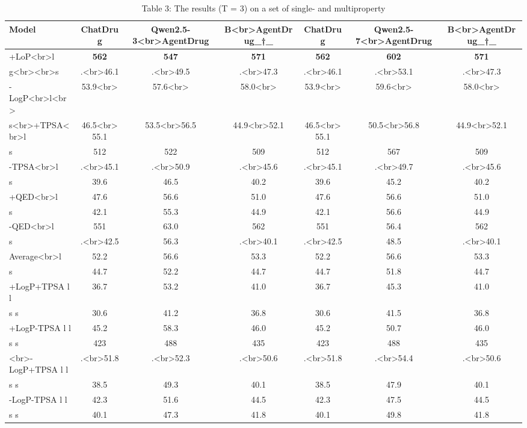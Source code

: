 \begin{table}[t]
\centering
\caption{Table 3: The results (T = 3) on a set of single- and multiproperty}
\label{tab:2410.13147}
\begin{tabular}{lcccccc}
\toprule
Model & ChatDrug & Qwen2.5-3<br>AgentDrug & B<br>AgentDrug\_†\_ & ChatDrug & Qwen2.5-7<br>AgentDrug & B<br>AgentDrug\_†\_ \\
\midrule
+LoP<br>l & \textbf{562} & \textbf{547} & \textbf{571} & \textbf{562} & \textbf{602} & \textbf{571} \\
g<br><br>s & .<br>46.1 & .<br>49.5 & .<br>47.3 & .<br>46.1 & .<br>53.1 & .<br>47.3 \\
-LogP<br>l<br> & 53.9<br> & 57.6<br> & 58.0<br> & 53.9<br> & 59.6<br> & 58.0<br> \\
s<br>+TPSA<br>l & 46.5<br>55.1 & 53.5<br>56.5 & 44.9<br>52.1 & 46.5<br>55.1 & 50.5<br>56.8 & 44.9<br>52.1 \\
s & 512 & 522 & 509 & 512 & 567 & 509 \\
-TPSA<br>l & .<br>45.1 & .<br>50.9 & .<br>45.6 & .<br>45.1 & .<br>49.7 & .<br>45.6 \\
s & 39.6 & 46.5 & 40.2 & 39.6 & 45.2 & 40.2 \\
+QED<br>l & 47.6 & 56.6 & 51.0 & 47.6 & 56.6 & 51.0 \\
s & 42.1 & 55.3 & 44.9 & 42.1 & 56.6 & 44.9 \\
-QED<br>l & 551 & 63.0 & 562 & 551 & 56.4 & 562 \\
s & .<br>42.5 & 56.3 & .<br>40.1 & .<br>42.5 & 48.5 & .<br>40.1 \\
Average<br>l & 52.2 & 56.6 & 53.3 & 52.2 & 56.6 & 53.3 \\
s & 44.7 & 52.2 & 44.7 & 44.7 & 51.8 & 44.7 \\
+LogP+TPSA l l & 36.7 & 53.2 & 41.0 & 36.7 & 45.3 & 41.0 \\
s s & 30.6 & 41.2 & 36.8 & 30.6 & 41.5 & 36.8 \\
+LogP-TPSA l l & 45.2 & 58.3 & 46.0 & 45.2 & 50.7 & 46.0 \\
s s & 423 & 488 & 435 & 423 & 488 & 435 \\
<br>-LogP+TPSA l l & .<br>51.8 & .<br>52.3 & .<br>50.6 & .<br>51.8 & .<br>54.4 & .<br>50.6 \\
s s & 38.5 & 49.3 & 40.1 & 38.5 & 47.9 & 40.1 \\
-LogP-TPSA l l & 42.3 & 51.6 & 44.5 & 42.3 & 47.5 & 44.5 \\
s s & 40.1 & 47.3 & 41.8 & 40.1 & 49.8 & 41.8 \\

\end{tabular}
\end{table}
